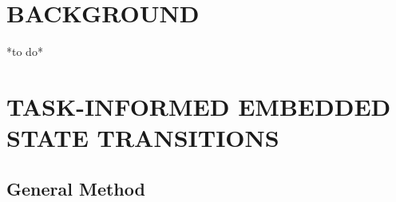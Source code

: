 \documentclass[letterpaper, 10 pt, conference]{ieeeconf}  %
\begin{document}
\section{BACKGROUND}
*to do*

\section{TASK-INFORMED EMBEDDED STATE TRANSITIONS}

\subsection{General Method}
\end{document}
